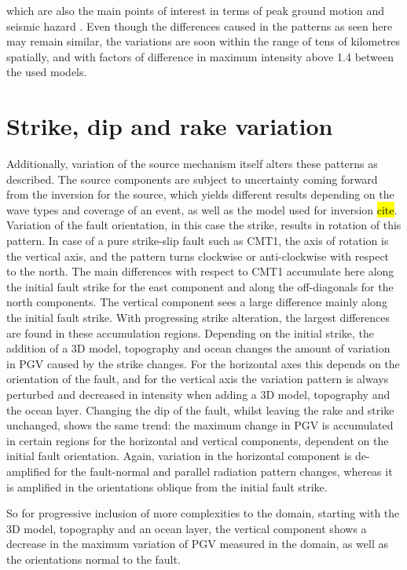 \documentclass[../00main.tex]{subfiles}
\begin{document}
which are also the main points of interest in terms of peak ground motion and seismic hazard \hl{}. Even though the differences caused in the patterns as seen here may remain similar, the variations are soon within the range of tens of kilometres spatially, and with factors of difference in maximum intensity above 1.4 between the used models. 

 
\section{Strike, dip and rake variation}

Additionally, variation of the source mechanism itself alters these patterns as described. The source components are subject to uncertainty coming forward from the inversion for the source, which yields different results depending on the wave types and coverage of an event, as well as the model used for inversion \hl{cite}. Variation of the fault orientation, in this case the strike, results in rotation of this pattern. In case of a pure strike-slip fault such as CMT1, the axis of rotation is the vertical axis, and the pattern turns clockwise or anti-clockwise with respect to the north. The main differences with respect to CMT1 accumulate here along the initial fault strike for the east component and along the off-diagonals for the north components. The vertical component sees a large difference mainly along the initial fault strike. With progressing strike alteration, the largest differences are found in these accumulation regions. Depending on the initial strike, the addition of a 3D model, topography and ocean changes the amount of variation in PGV caused by the strike changes. For the horizontal axes this depends on the orientation of the fault, and for the vertical axis the variation pattern is always perturbed and decreased in intensity when adding a 3D model, topography and the ocean layer. Changing the dip of the fault, whilst leaving the rake and strike unchanged, shows the same trend: the maximum change in PGV is accumulated in certain regions for the horizontal and vertical components, dependent on the initial fault orientation. Again, variation in the horizontal component is de-amplified for the fault-normal and parallel radiation pattern changes, whereas it is amplified in the orientations oblique from the initial fault strike. 

So for progressive inclusion of more complexities to the domain, starting with the 3D model, topography and an ocean layer, the vertical component shows a decrease in the maximum variation of PGV measured in the domain, as well as the orientations normal to the fault. 
\end{document}
